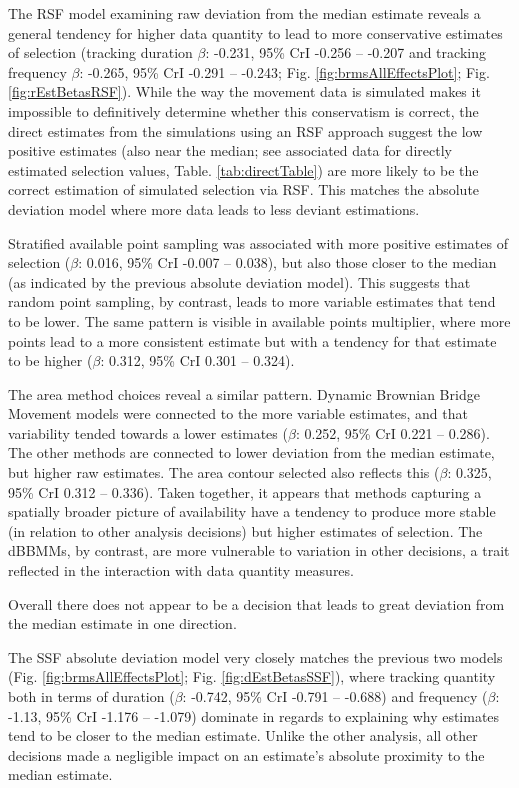 \documentclass[10pt,a4paper]{article}
\begin{document}
The RSF model examining raw deviation from the median estimate reveals a general tendency for higher data quantity to lead to more conservative estimates of selection (tracking duration \(\beta\): -0.231, 95\% CrI -0.256 -- -0.207 and tracking frequency \(\beta\): -0.265, 95\% CrI -0.291 -- -0.243; Fig. \ref{fig:brmsAllEffectsPlot}; Fig. \ref{fig:rEstBetasRSF}).
While the way the movement data is simulated makes it impossible to definitively determine whether this conservatism is correct, the direct estimates from the simulations using an RSF approach suggest the low positive estimates (also near the median; see associated data for directly estimated selection values, Table. \ref{tab:directTable}) are more likely to be the correct estimation of simulated selection via RSF.
This matches the absolute deviation model where more data leads to less deviant estimations.

Stratified available point sampling was associated with more positive estimates of selection (\(\beta\): 0.016, 95\% CrI -0.007 -- 0.038), but also those closer to the median (as indicated by the previous absolute deviation model).
This suggests that random point sampling, by contrast, leads to more variable estimates that tend to be lower.
The same pattern is visible in available points multiplier, where more points lead to a more consistent estimate but with a tendency for that estimate to be higher (\(\beta\): 0.312, 95\% CrI 0.301 -- 0.324).

The area method choices reveal a similar pattern.
Dynamic Brownian Bridge Movement models were connected to the more variable estimates, and that variability tended towards a lower estimates (\(\beta\): 0.252, 95\% CrI 0.221 -- 0.286).
The other methods are connected to lower deviation from the median estimate, but higher raw estimates.
The area contour selected also reflects this (\(\beta\): 0.325, 95\% CrI 0.312 -- 0.336).
Taken together, it appears that methods capturing a spatially broader picture of availability have a tendency to produce more stable (in relation to other analysis decisions) but higher estimates of selection.
The dBBMMs, by contrast, are more vulnerable to variation in other decisions, a trait reflected in the interaction with data quantity measures.

Overall there does not appear to be a decision that leads to great deviation from the median estimate in one direction.

The SSF absolute deviation model very closely matches the previous two models (Fig. \ref{fig:brmsAllEffectsPlot}; Fig. \ref{fig:dEstBetasSSF}), where tracking quantity both in terms of duration (\(\beta\): -0.742, 95\% CrI -0.791 -- -0.688) and frequency (\(\beta\): -1.13, 95\% CrI -1.176 -- -1.079) dominate in regards to explaining why estimates tend to be closer to the median estimate.
Unlike the other analysis, all other decisions made a negligible impact on an estimate's absolute proximity to the median estimate.
\end{document}
